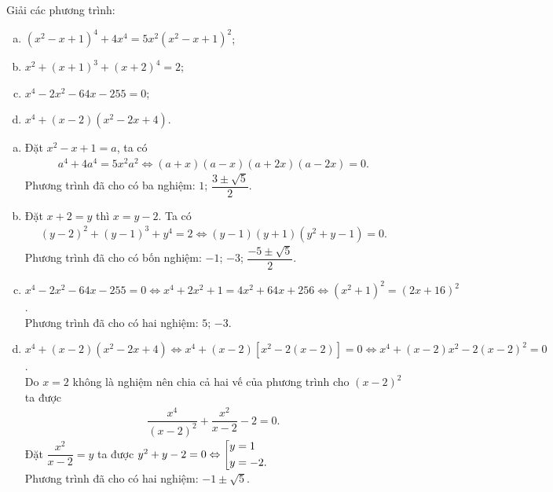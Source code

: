 	\begin{bt}
		Giải các phương trình:
		\begin{enumerate}[a)]
			\item $\left(x^2-x+1\right)^4 + 4x^4 = 5x^2 \left(x^2-x+1\right)^2$;
			\item $x^2 + (x+1)^3 + (x+2)^4 = 2$;
			\item $x^4 - 2x^2 - 64x - 255 = 0$;
			\item $x^4 + (x-2)\left(x^2-2x+4\right)$.
		\end{enumerate}
		\loigiai 
		{
			\begin{enumerate}[a)]
				\item Đặt $x^2-x+1=a$, ta có
					\begin{align*}
						a^4+4a^4=5x^2a^2 \Leftrightarrow (a+x)(a-x)(a+2x)(a-2x)=0.
					\end{align*}
					Phương trình đã cho có ba nghiệm: $1$; $\dfrac{3 \pm \sqrt{5}}{2}$.
				\item Đặt $x+2=y$ thì $x = y-2$. Ta có
					\begin{align*}
						(y-2)^2+(y-1)^3+y^4 = 2 \Leftrightarrow (y-1)(y+1)(y^2+y-1)=0.
					\end{align*}
					Phương trình đã cho có bốn nghiệm: $-1$; $-3$; $\dfrac{-5 \pm \sqrt{5}}{2}$.
				\item $x^4 - 2x^2 - 64x - 255 = 0 \Leftrightarrow x^4+2x^2+1 = 4x^2+64x+256 \Leftrightarrow (x^2+1)^2=(2x+16)^2$. \\
				Phương trình đã cho có hai nghiệm: $5$; $-3$.
				\item $x^4 + (x-2)\left(x^2-2x+4\right) \Leftrightarrow x^4 + (x-2)\left[x^2 - 2(x-2)\right] = 0 \Leftrightarrow x^4+(x-2)x^2 - 2(x-2)^2 = 0$. \\
				Do $x = 2$ không là nghiệm nên chia cả hai vế của phương trình cho $(x-2)^2$ ta được
				\begin{align*}
					\dfrac{x^4}{(x-2)^2} + \dfrac{x^2}{x-2} - 2 = 0.
				\end{align*}
				Đặt $\dfrac{x^2}{x-2} = y$ ta được $y^2 + y - 2 = 0 \Leftrightarrow \left[\begin{aligned}&y=1 \\ &y=-2.\end{aligned}\right.$ \\
				Phương trình đã cho có hai nghiệm: $-1 \pm \sqrt{5}.$
			\end{enumerate}
		}
	\end{bt}

